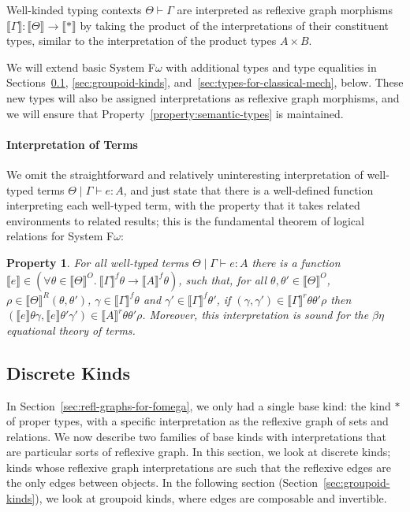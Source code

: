 \documentclass{sigplanconf}
\newcommand{\sepbar}{\mathrel|}
\newtheorem{property}{Property}
\theoremstyle{examplestyle}
\newcommand{\sem}[1]{\llbracket #1 \rrbracket}
\newcommand{\semKU}[1]{\llbracket #1 \rrbracket^O}
\newcommand{\semKR}[1]{\llbracket #1 \rrbracket^R}
\begin{document}
Well-kinded typing contexts $\Theta \vdash \Gamma$ are interpreted as
reflexive graph morphisms $\sem{\Gamma} : \sem{\Theta} \to \sem{*}$ by
taking the product of the interpretations of their constituent types,
similar to the interpretation of the product types $A \times B$.

We will extend basic System F$\omega$ with additional types and type
equalities in Sections~\ref{sec:discrete-kinds},
\ref{sec:groupoid-kinds}, and~\ref{sec:types-for-classical-mech},
below. These new types will also be assigned interpretations as
reflexive graph morphisms, and we will ensure that
Property~\ref{property:semantic-types} is maintained.

\paragraph{Interpretation of Terms} We omit the straightforward and
relatively uninteresting interpretation of well-typed terms $\Theta
\sepbar \Gamma \vdash e : A$, and just state that there is a
well-defined function interpreting each well-typed term, with the
property that it takes related environments to related results; this
is the fundamental theorem of logical relations for System F$\omega$:

\begin{property}\label{property:semantic-terms}
  For all well-typed terms $\Theta \sepbar \Gamma \vdash e : A$ there
  is a function $\sem{e} \in (\forall \theta \in \semKU{\Theta}.\
  \sem{\Gamma}^f\theta \to \sem{A}^f\theta)$, such that, for all
  $\theta, \theta' \in \semKU{\Theta}$, $\rho \in
  \semKR{\Theta}(\theta,\theta')$, $\gamma \in \sem{\Gamma}^f\theta$
  and $\gamma' \in \sem{\Gamma}^f\theta'$, if $(\gamma, \gamma') \in
  \sem{\Gamma}^r\theta\theta'\rho$ then $(\sem{e}\theta\gamma,
  \sem{e}\theta'\gamma') \in \sem{A}^r\theta\theta'\rho$.  Moreover,
  this interpretation is sound for the $\beta\eta$ equational theory
  of terms.
\end{property}

\subsection{Discrete Kinds}
\label{sec:discrete-kinds}

In Section~\ref{sec:refl-graphs-for-fomega}, we only had a single base
kind: the kind $*$ of proper types, with a specific interpretation as
the reflexive graph of sets and relations. We now describe two
families of base kinds with interpretations that are particular sorts
of reflexive graph. In this section, we look at discrete kinds; kinds
whose reflexive graph interpretations are such that the reflexive
edges are the only edges between objects. In the following section
(Section~\ref{sec:groupoid-kinds}), we look at groupoid kinds, where
edges are composable and invertible.
\end{document}
